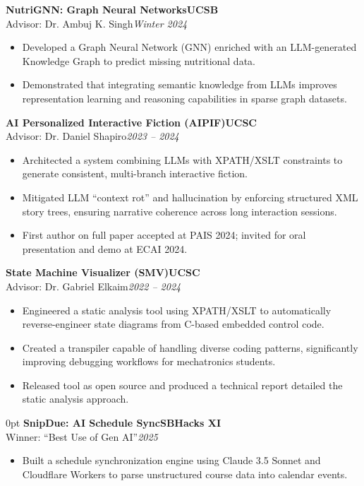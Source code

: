 \documentclass[11pt]{article}
\newlength{\sectionwidth}
\newcommand{\CVSection}[2]{%
  \vspace{1.4em} 
  \noindent
  \makebox[0pt][l]{%
    \parbox[t]{\sectionwidth}{%
      \raggedright\scshape\bfseries\small #1%
    }%
  }%
  \begin{adjustwidth}{\sectionwidth}{0pt}
    #2
  \end{adjustwidth}
}
\newcommand{\CVEntry}[4]{%
  \vspace{0.4em} %
  {\bfseries #1}\hfill {\bfseries #2}\\[0.1em] 
  #3\hfill \textit{#4}
}
\begin{document}
{\begin{itemize}
  \end{itemize}
  \vspace{0.4em}
  \CVEntry
    {NutriGNN: Graph Neural Networks}
    {UCSB}
    {Advisor: Dr. Ambuj K. Singh}
    {Winter 2024}
  \begin{itemize}
    \item Developed a Graph Neural Network (GNN) enriched with an LLM-generated Knowledge Graph to predict missing nutritional data.
    \item Demonstrated that integrating semantic knowledge from LLMs improves representation learning and reasoning capabilities in sparse graph datasets.
  \end{itemize}
  \vspace{0.4em}
  \CVEntry
    {AI Personalized Interactive Fiction (AIPIF)}
    {UCSC}
    {Advisor: Dr. Daniel Shapiro}
    {2023 -- 2024}
  \begin{itemize}
    \item Architected a system combining LLMs with XPATH/XSLT constraints to generate consistent, multi-branch interactive fiction.
    \item Mitigated LLM ``context rot'' and hallucination by enforcing structured XML story trees, ensuring narrative coherence across long interaction sessions.
    \item First author on full paper accepted at PAIS 2024; invited for oral presentation and demo at ECAI 2024.
  \end{itemize}
  \vspace{0.4em}
  \CVEntry
    {State Machine Visualizer (SMV)}
    {UCSC}
    {Advisor: Dr. Gabriel Elkaim}
    {2022 -- 2024}
  \begin{itemize}
    \item Engineered a static analysis tool using XPATH/XSLT to automatically reverse-engineer state diagrams from C-based embedded control code.
    \item Created a transpiler capable of handling diverse coding patterns, significantly improving debugging workflows for mechatronics students.
    \item Released tool as open source and produced a technical report detailed the static analysis approach.
  \end{itemize}
}

\CVSection{Awards \&\\Projects}{%
  \CVEntry
    {SnipDue: AI Schedule Sync}
    {SBHacks XI}
    {Winner: ``Best Use of Gen AI''}
    {2025}
  \begin{itemize}
    \item Built a schedule synchronization engine using Claude 3.5 Sonnet and Cloudflare Workers to parse unstructured course data into calendar events.
  \end{itemize}
}
\end{document}
